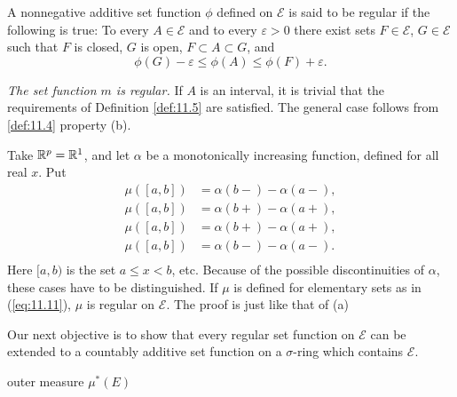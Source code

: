 \begin{mydef}
    \label{def:11.5}
    A nonnegative additive set function $\phi$ defined on $\mathscr{E}$ is said to be regular if the following is true: 
    To every $A \in \mathscr{E}$ and to every $\varepsilon > 0$ 
    there exist sets $F \in \mathscr{E}$, $G \in \mathscr{E}$ 
    such that $F$ is closed, $G$ is open, $F \subset A \subset G$, 
    and
    \begin{equation}
        \label{eq:11.16}
        \phi(G) - \varepsilon \leq 
        \phi(A) \leq 
        \phi(F) + \varepsilon . 
    \end{equation}
\end{mydef}

\begin{myExample}
    \begin{asparaenum}[(a)]
        \item \emph{The set function $m$ is regular.}
        If $A$ is an interval, it is trivial that the requirements of Definition \ref{def:11.5} are satisfied. The general case follows from \ref{def:11.4} property (b).
        \item Take ${\protect\mathbb R}^p = {\protect\mathbb R}^1$, and let $\alpha$ be a monotonically increasing function, defined for all real $x$. Put 
        \begin{align*}
            \mu([a,b]) &= \alpha(b-)-\alpha(a-),\\
            \mu([a,b]) &= \alpha(b+)-\alpha(a+),\\
            \mu([a,b]) &= \alpha(b+)-\alpha(a+),\\
            \mu([a,b]) &= \alpha(b-)-\alpha(a-).\\
        \end{align*}
        Here $[a,b)$ is the set $a \leq x < b$, etc.
        Because of the possible discontinuities of $\alpha$, these cases have to be distinguished.
        If $\mu$ is defined for elementary sets as in (\ref{eq:11.11}), $\mu$ is regular on $\mathscr{E}$.
        The proof is just like that of (a)
        \item 
    \end{asparaenum}
\end{myExample}

Our next objective is to show that every regular set function on $\mathscr{E}$ can be
extended to a countably additive set function on a $\sigma$-ring which contains $\mathscr{E}$.

\begin{mydef}
    \label{def:11.7}
    outer measure $\mu^*(E)$
\end{mydef}

